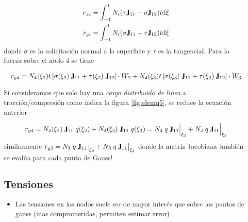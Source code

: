 \documentclass[11pt, a4paper,titlepage]{article}
\newcommand{\rmfontbf}[1]{{\fontfamily{ptm}\selectfont%
\textbf{#1}}}
\newcommand{\di}{\textrm{d}}
\newcommand{\jac}{\rmfontbf{J}}
\newcommand{\feaSP}{null.tex}
\begin{document}
\begin{align}
r_{xi}&=\int^1_{-1}N_i (\tau \jac_{11}- \sigma \jac_{12})t\di \xi \\
r_{yi}&=\int^1_{-1}N_i (\sigma \jac_{11}+\tau \jac_{12})t \di \xi 
\end{align}
donde $\sigma$ es la solicitación normal a la superficie y $\tau$ es la tangencial. Para la fuerza sobre el nodo 4 se tiene

$$r_{y4}= N_4(\xi_2)t\left[\sigma(\xi_2)\; \jac_{11}+\tau(\xi_2)\; \jac_{12}\right] \cdot W_2 + N_4(\xi_3)t\left[\sigma(\xi_3)\; \jac_{11}+\tau(\xi_3)\; \jac_{12}\right]\cdot W_3 $$

Si consideramos que solo hay una \emph{carga distribuida de linea} a tracción/compresión como indica la figura \ref{fig:elemq5}, se reduce la ecuación anterior

$$ r_{y4} = N_4(\xi_2)\;\jac_{11}\;q(\xi_2) + N_4(\xi_3)\;\jac_{11}\;q(\xi_3) =N_4\;q \;\jac_{11}\Big|_{\xi_2} + N_4\;q\; \jac_{11}\Big|_{\xi_3} $$
similarmente $r_{y3} = N_3\;q \;\jac_{11}\big|_{\xi_2} + N_3\;q\; \jac_{11}\big|_{\xi_3} $ donde la matriz Jacobiana también se evalúa para cada punto de Gauss!


\subsection*{Tensiones}
    \begin{itemize}
        \item Las tensiones en los nodos suele ser de mayor interés que sobre los puntos de gauss (mas comprometidas, permiten estimar error)
    \end{itemize}

 
\end{document}
